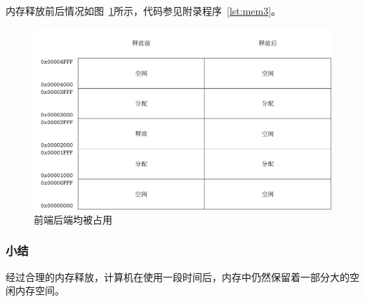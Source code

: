 内存释放前后情况如图~\ref{fig:mem3}所示，代码参见附录程序~\ref{lst:mem3}。
\begin{figure}
  \centering
  \includegraphics[width=.7\textwidth]{../Fig/mem3.pdf}
  \caption{前端后端均被占用}
  \label{fig:mem3}
\end{figure}

\subsubsection{小结}
经过合理的内存释放，计算机在使用一段时间后，内存中仍然保留着一部分大的空闲内存空间。
